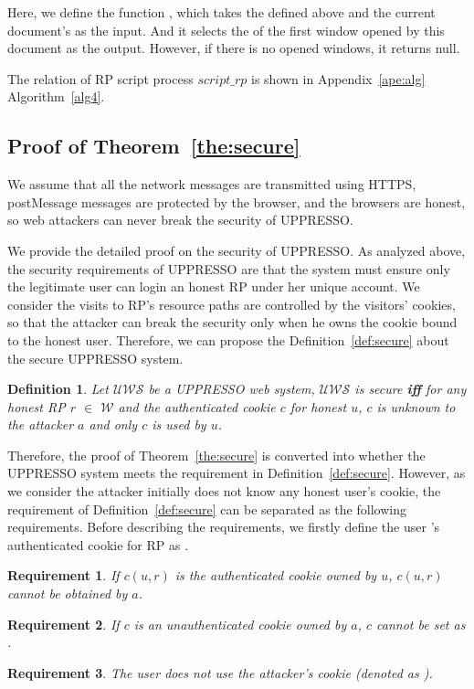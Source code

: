 Here, we define the function , which takes the  defined above and the current document's  as the input. And it selects the  of the first window opened by this document as the output. However, if there is no opened windows, it returns  null.

The relation of RP script process $script\_rp$ is shown in Appendix~\ref{ape:alg} Algorithm~\ref{alg4}.



\subsection{Proof of Theorem~\ref{the:secure}}


\newtheorem{redef}{Definition}
\newtheorem{req}{Requirement}
\newtheorem{relemma}{Lemma}

We assume that all the network messages are transmitted using HTTPS, postMessage messages are protected by the browser, and the browsers are  honest, so web attackers can never break the security of UPPRESSO.

We provide the detailed proof on the security of UPPRESSO. As analyzed above, the security requirements of UPPRESSO are that the system must ensure only the legitimate user can login an honest RP under her unique account. We consider the visits to RP's resource paths are controlled by the visitors' cookies, so that the attacker can break the security only when he owns the cookie bound to the honest user. Therefore, we can propose the Definition~\ref{def:secure} about the secure UPPRESSO system.
\begin{redef}
Let $\mathcal{UWS}$ be a UPPRESSO web system, $\mathcal{UWS}$ is secure \textbf{iff} for any honest RP $r$ $\in $ $\mathcal{W}$ and  the authenticated cookie $c$ for honest $u$,  $c$ is unknown to the attacker $a$ and only $c$ is used by $u$.
\end{redef}
Therefore, the proof of Theorem~\ref{the:secure} is converted into whether the UPPRESSO system meets the requirement in Definition~\ref{def:secure}. However, as we consider the attacker initially does not know any honest user's cookie, the requirement of Definition~\ref{def:secure} can be separated as the following requirements. Before describing the requirements, we firstly define the user 's authenticated cookie for RP  as .
\begin{req}
If $c(u,r)$ is the authenticated cookie owned by $u$, $c(u,r)$ cannot be obtained by $a$.
\label{req:cookie1}
\end{req}
\begin{req}
If $c$ is an unauthenticated cookie owned by $a$, $c$ cannot be set as .
\label{req:cookie2}
\end{req}
\begin{req}
The user  does not use the attacker's cookie (denoted as ).
\label{req:cookie3}
\end{req}


